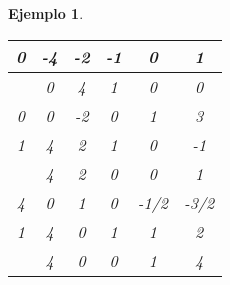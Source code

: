 \documentclass[11pt]{report}
\theoremstyle{mytheorem}
\theoremstyle{mydefinition}
\theoremstyle{myexample}
\newtheorem*{example}{Ejemplo}
\begin{document}
\begin{example}
\begin{center}
\begin{tabular}{|c|c|c|c|c|c|}
    0 & -4 & \multicolumn{1}{c}{-2} & \multicolumn{1}{c}{-1} & \multicolumn{1}{c}{\phantom{-}0} & \multicolumn{1}{c|}{\phantom{-}1} \\ \hline
    
    \multicolumn{1}{c|}{} & \phantom{-}0 & \multicolumn{1}{c}{\phantom{-}4} & \multicolumn{1}{c}{\phantom{-}1} & \multicolumn{1}{c}{\phantom{-}0} & \multicolumn{1}{c|}{\phantom{-}0} \\ \hhline{-|=|=|=|=|=|}

    0 & \phantom{-}0 & \multicolumn{1}{c}{-2} & \multicolumn{1}{c}{\phantom{-}0} & \multicolumn{1}{c}{\phantom{-}1} & \multicolumn{1}{c|}{\phantom{-}3} \\
    
    1 & \phantom{-}4 & \multicolumn{1}{c}{\phantom{-}2} & \multicolumn{1}{c}{\phantom{-}1} & \multicolumn{1}{c}{\phantom{-}0} & \multicolumn{1}{c|}{-1} \\ \hline
    
    \multicolumn{1}{c|}{} & \phantom{-}4 & \multicolumn{1}{c}{\phantom{-}2} & \multicolumn{1}{c}{\phantom{-}0} & \multicolumn{1}{c}{\phantom{-}0} & \multicolumn{1}{c|}{\phantom{-}1} \\ \hhline{-|=|=|=|=|=|}

    4 & \phantom{-}0 & \multicolumn{1}{c}{\phantom{-}1} & \multicolumn{1}{c}{\phantom{-}0} & \multicolumn{1}{c}{-1/2} & \multicolumn{1}{c|}{-3/2} \\
    
    1 & \phantom{-}4 & \multicolumn{1}{c}{\phantom{-}0} & \multicolumn{1}{c}{\phantom{-}1} & \multicolumn{1}{c}{\phantom{-}1} & \multicolumn{1}{c|}{\phantom{-}2} \\ \hline
    
    \multicolumn{1}{c|}{} & \phantom{-}4 & \multicolumn{1}{c}{\phantom{-}0} & \multicolumn{1}{c}{\phantom{-}0} & \multicolumn{1}{c}{\phantom{-}1} & \multicolumn{1}{c|}{\phantom{-}4} \\
    

\end{tabular}
\end{center}
\end{example}
\end{document}

